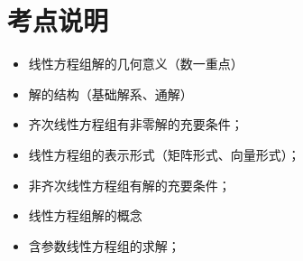 \section{考点说明}
\begin{itemize}
\item 线性方程组解的几何意义（数一重点）
\item 解的结构（基础解系、通解）
\item 齐次线性方程组有非零解的充要条件；
\item 线性方程组的表示形式（矩阵形式、向量形式）；
\item 非齐次线性方程组有解的充要条件；
\item 线性方程组解的概念
\item 含参数线性方程组的求解；
\end{itemize}

